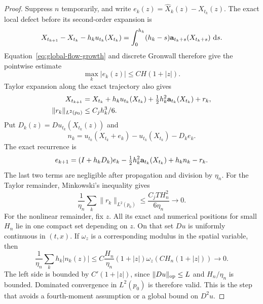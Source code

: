 \begin{proof}
Suppress $n$ temporarily, and write $e_k(z)=\widehat X_k(z)-X_{t_k}(z)$.
The exact local defect before its second-order expansion is
\[
 X_{t_{k+1}}-X_{t_k}-h_ku_{t_k}(X_{t_k})
 =\int_0^{h_k}(h_k-s)\mathbf a_{t_k+s}(X_{t_k+s})\,\,\mathrm d s.
\]
Equation~\eqref{eq:global-flow-growth} and discrete Gronwall therefore
give the pointwise estimate
\begin{equation}
 \max_k|e_k(z)|\le C H(1+|z|).
 \label{eq:global-pointwise-euler-bound}
\end{equation}
Taylor expansion along the exact trajectory also gives
\begin{align*}
 X_{t_{k+1}}={}&X_{t_k}+h_ku_{t_k}(X_{t_k})
      +\tfrac12h_k^2\mathbf a_{t_k}(X_{t_k})+r_k,\\
 \|r_k\|_{L^2(p_0)}\le{}& C_jh_k^3/6.
\end{align*}
Put $D_k(z)=Du_{t_k}(X_{t_k}(z))$ and
\[
 n_k=u_{t_k}(X_{t_k}+e_k)-u_{t_k}(X_{t_k})-D_ke_k.
\]
The exact recurrence is
\begin{equation}
 e_{k+1}=(I+h_kD_k)e_k
       -\tfrac12h_k^2\mathbf a_{t_k}(X_{t_k})+h_kn_k-r_k.
 \label{eq:global-error-recurrence}
\end{equation}
The last two terms are negligible after propagation and division by
$\eta_n$.  For the Taylor remainder, Minkowski's inequality gives
\[
 \frac1{\eta_n}\sum_k\|r_k\|_{L^2(p_0)}
 \le\frac{C_jTH_n^2}{6\eta_n}\longrightarrow0.
\]
For the nonlinear remainder, fix $z$.  All its exact and numerical
positions for small $H_n$ lie in one compact set depending on $z$.
On that set $Du$ is uniformly continuous in $(t,x)$.  If $\omega_z$
is a corresponding modulus in the spatial variable, then
\[
 \frac1{\eta_n}\sum_k h_k|n_k(z)|
 \le C\frac{H_n}{\eta_n}(1+|z|)
               \omega_z(CH_n(1+|z|))\longrightarrow0.
\]
The left side is bounded by $C'(1+|z|)$, since
$\|Du\|_{\rm op}\le L$ and $H_n/\eta_n$ is bounded.
Dominated convergence in $L^2(p_0)$ is therefore valid.  This is the
step that avoids a fourth-moment assumption or a global bound on
$D^2u$.


\end{proof}
